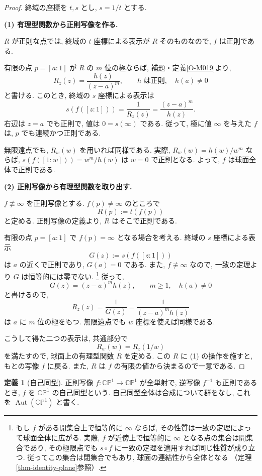 \documentclass[dvipdfmx,a4paper,11pt]{article} %
\newcommand{\C}{\mathbb{C}}
\theoremstyle{definition}
\numberwithin{equation}{section}
\newtheorem{dfn}[thm]{定義}
\begin{document}
\begin{proof}
終域の座標を $t,s$ とし, $s=1/t$ とする.

\textbf{(1) 有理型関数から正則写像を作る.}

$R$ が正則な点では, 終域の $t$ 座標による表示が
$R$ そのものなので, $f$ は正則である.

有限の点 $p=[a:1]$ が $R$ の $m$ 位の極ならば,
補題・定義\ref{O-M019}より,
\[
R_z(z)=\frac{h(z)}{(z-a)^m},
\qquad h\text{ は正則},\quad h(a)\neq0
\]
と書ける.
このとき, 終域の $s$ 座標による表示は
\[
s(f([z:1]))=\frac1{R_z(z)}
=\frac{(z-a)^m}{h(z)}.
\]
右辺は $z=a$ でも正則で, 値は $0=s(\infty)$ である.
従って, 極に値 $\infty$ を与えた $f$ は,
$p$ でも連続かつ正則である.

無限遠点でも, $R_w(w)$ を用いれば同様である.
実際, $R_w(w)=h(w)/w^m$ ならば,
$s(f([1:w]))=w^m/h(w)$ は $w=0$ で正則となる.
よって, $f$ は球面全体で正則である.

\medskip
\noindent
\textbf{(2) 正則写像から有理型関数を取り出す.}

$f\not\equiv\infty$ を正則写像とする.
$f(p)\neq\infty$ のところで
\[
R(p):=t(f(p))
\]
と定める.
正則写像の定義より, $R$ はそこで正則である.

有限の点 $p=[a:1]$ で $f(p)=\infty$ となる場合を考える.
終域の $s$ 座標による表示
\[
G(z):=s(f([z:1]))
\]
は $a$ の近くで正則であり, $G(a)=0$ である.
また, $f\not\equiv\infty$ なので,
一致の定理より $G$ は恒等的には零でない.
\footnote{
もし $f$ がある開集合上で恒等的に $\infty$ ならば,
その性質は一致の定理によって球面全体に広がる.
実際, $f$ が近傍上で恒等的に $\infty$ となる点の集合は開集合であり,
その極限点でも $s\circ f$ に一致の定理を適用すれば同じ性質が成り立つ.
従ってこの集合は閉集合でもあり, 球面の連結性から全体となる
（定理\ref{thm-identity-plane}参照）.
}
従って,
\[
G(z)=(z-a)^m h(z),
\qquad m\geq1,\quad h(a)\neq0
\]
と書けるので,
\[
R_z(z)=\frac1{G(z)}
=\frac1{(z-a)^m h(z)}
\]
は $a$ に $m$ 位の極をもつ.
無限遠点でも $w$ 座標を使えば同様である.

こうして得た二つの表示は, 共通部分で
\[
R_w(w)=R_z(1/w)
\]
を満たすので, 球面上の有理型関数 $R$ を定める.
この $R$ に (1) の操作を施すと, もとの写像 $f$ に戻る.
また, $R$ は $f$ の有限の値から決まるので一意である.
\end{proof}

\begin{dfn}[自己同型]
正則写像 $f:\C\mathbb P^1\to\C\mathbb P^1$ が全単射で, 
逆写像 $f^{-1}$ も正則であるとき, $f$ を $\C\mathbb P^1$ の自己同型という.
自己同型全体は合成について群をなし, これを
$\operatorname{Aut}(\C\mathbb P^1)$ と書く.
\end{dfn}
\end{document}
